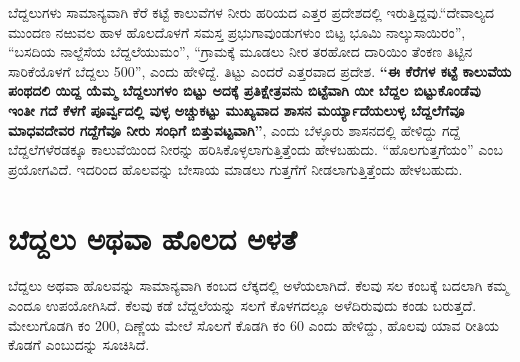 ಬೆದ್ದಲುಗಳು ಸಾಮಾನ್ಯವಾಗಿ ಕೆರೆ ಕಟ್ಟೆ ಕಾಲುವೆಗಳ ನೀರು ಹರಿಯದ ಎತ್ತರ ಪ್ರದೇಶದಲ್ಲಿ ಇರುತ್ತಿದ್ದವು.\break “ದೇವಾಲ್ಯದ ಮುಂದಣ ನಱುವಲ ಹಾಳ ಹೊಲದೊಳಗೆ ಸಮಸ್ತ ಪ್ರಭುಗಾವುಂಡುಗಳುಂ ಬಿಟ್ಟ ಭೂಮಿ ನಾಲ್ಕುಸಾಯಿರಂ”, “ಬಸದಿಯ ನಾಲ್ದೆಸೆಯ ಬೆದ್ದಲೆಯುಮಂ”, “ಗ್ರಾಮಕ್ಕೆ ಮೂಡಲು ನೀರ ತರಹೋದ ದಾರಿಯಿಂ ತೆಂಕಣ ತಿಟ್ಟಿನ ಸಾರಿಕೆಯೊಳಗೆ ಬೆದ್ದಲು 500”, ಎಂದು ಹೇಳಿದ್ದೆ. ತಿಟ್ಟು ಎಂದರೆ ಎತ್ತರವಾದ ಪ್ರದೇಶ. \textbf{“ಈ ಕೆರೆಗಳ ಕಟ್ಟೆ ಕಾಲುವೆಯ ಪಂಥದಲಿ ಯಿದ್ದ ಯೆಮ್ಮ ಬೆದ್ದಲುಗಳಂ ಬಿಟ್ಟು ಅದಕ್ಕೆ ಪ್ರತಿಕ್ಷೇತ್ರವನು ಬಿಟ್ಟೆವಾಗಿ ಯೀ ಬೆದ್ದಲ ಬಿಟ್ಟುಕೊಂಡೆವು ಇಂತೀ ಗದೆ ಕೆಳಗೆ ಪೂರ್ವ್ವದಲ್ಲಿ ವುಳ್ಳ ಅಚ್ಚುಕಟ್ಟು ಮುಖ್ಯವಾದ ಶಾಸನ ಮರ್ಯ್ಯಾದೆಯಲುಳ್ಳ ಬೆದ್ದಲೆಗೆವೂ ಮಾಧವದೇವರ ಗದ್ದೆಗೆವೂ ನೀರು ಸಂಧಿಗೆ ಬಿತ್ತುವಟ್ಟವಾಗಿ”}, ಎಂದು ಬೆಳ್ಳೂರು ಶಾಸನದಲ್ಲಿ ಹೇಳಿದ್ದು ಗದ್ದೆ ಬೆದ್ದಲೆಗಳೆರಡಕ್ಕೂ ಕಾಲುವೆಯಿಂದ ನೀರನ್ನು ಹರಿಸಿ\-ಕೊಳ್ಳಲಾಗುತ್ತಿತ್ತೆಂದು ಹೇಳಬಹುದು. “ಹೊಲಗುತ್ತಗೆಯಂ” ಎಂಬ ಪ್ರಯೋಗವಿದೆ. ಇದರಿಂದ ಹೊಲವನ್ನು ಬೇಸಾಯ ಮಾಡಲು ಗುತ್ತಗೆಗೆ ನೀಡಲಾಗುತ್ತಿತ್ತೆಂದು ಹೇಳಬಹುದು.


\section*{ಬೆದ್ದಲು ಅಥವಾ ಹೊಲದ ಅಳತೆ}

ಬೆದ್ದಲು ಅಥವಾ ಹೊಲವನ್ನು ಸಾಮಾನ್ಯವಾಗಿ ಕಂಬದ ಲೆಕ್ಕದಲ್ಲಿ ಅಳೆಯಲಾಗಿದೆ. ಕೆಲವು ಸಲ ಕಂಬಕ್ಕೆ ಬದಲಾಗಿ ಕಮ್ಮ ಎಂದೂ ಉಪಯೋಗಿಸಿದೆ. ಕೆಲವು ಕಡೆ ಬೆದ್ದಲೆಯನ್ನು ಸಲಗೆ ಕೊಳಗದಲ್ಲೂ ಅಳೆದಿರುವುದು ಕಂಡು ಬರುತ್ತದೆ. ಮೇಲುಗೊಡಗಿ ಕಂ 200, ದಿಣ್ಣೆಯ ಮೇಲೆ ಸೊಲಗೆ ಕೊಡಗಿ ಕಂ 60 ಎಂದು ಹೇಳಿದ್ದು, ಹೊಲವು ಯಾವ ರೀತಿಯ ಕೊಡಗೆ ಎಂಬುದನ್ನು ಸೂಚಿಸಿದೆ.

